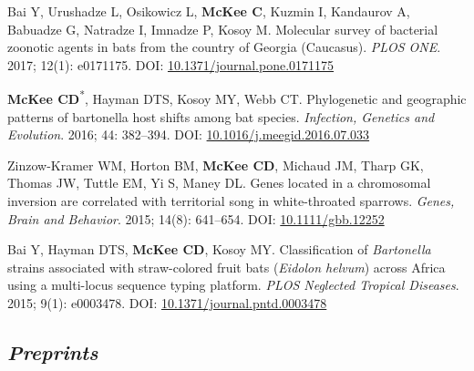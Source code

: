 \documentclass{cv}
\begin{document}
\begin{pubenum}
\item Bai Y, Urushadze L, Osikowicz L, \textbf{McKee C}, Kuzmin I, Kandaurov A, Babuadze G, Natradze I, Imnadze P, Kosoy M. Molecular survey of bacterial zoonotic agents in bats from the country of Georgia (Caucasus). \textit{PLOS ONE}. 2017; 12(1): e0171175. DOI: \href{https://doi.org/10.1371/journal.pone.0171175}{10.1371/journal.pone.0171175}

\item \textbf{McKee CD}\textsuperscript{*}, Hayman DTS, Kosoy MY, Webb CT. Phylogenetic and geographic patterns of bartonella host shifts among bat species. \textit{Infection, Genetics and Evolution}. 2016; 44: 382--394. DOI: \href{https://doi.org/10.1016/j.meegid.2016.07.033}{10.1016/j.meegid.2016.07.033}

\item Zinzow-Kramer WM, Horton BM, \textbf{McKee CD}, Michaud JM, Tharp GK, Thomas JW, Tuttle EM, Yi S, Maney DL. Genes located in a chromosomal inversion are correlated with territorial song in white-throated sparrows. \textit{Genes, Brain and Behavior}. 2015; 14(8): 641--654. DOI: \href{https://doi.org/10.1111/gbb.12252}{10.1111/gbb.12252}

\item Bai Y, Hayman DTS, \textbf{McKee CD}, Kosoy MY. Classification of \textit{Bartonella} strains associated with straw-colored fruit bats (\textit{Eidolon helvum}) across Africa using a multi-locus sequence typing platform. \textit{PLOS Neglected Tropical Diseases}. 2015; 9(1): e0003478. DOI: \href{https://doi.org/10.1371/journal.pntd.0003478}{10.1371/journal.pntd.0003478}

\end{pubenum}

\subsection*{\textit{Preprints}}
\end{document}
